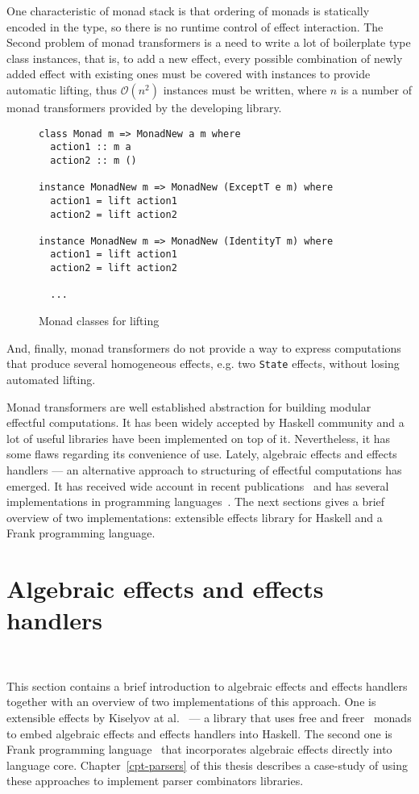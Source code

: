   One characteristic of monad stack is that ordering of monads is statically encoded
  in the type, so there is no runtime control of effect interaction.
  The Second problem of monad transformers is a need to write a lot of boilerplate
  type class instances, that is, to add a new effect, every possible combination
  of newly added effect with existing ones must be covered with instances to provide
  automatic lifting, thus $\mathcal{O}(n^2)$ instances must be written,
  where $n$ is a number of monad transformers provided by the developing library.

  \begin{figure}[h]
  \begin{lstlisting}
class Monad m => MonadNew a m where
  action1 :: m a
  action2 :: m ()

instance MonadNew m => MonadNew (ExceptT e m) where
  action1 = lift action1
  action2 = lift action2

instance MonadNew m => MonadNew (IdentityT m) where
  action1 = lift action1
  action2 = lift action2

  ...
  \end{lstlisting}
  \caption{Monad classes for lifting}
  \label{listing:mtlLift}
  \end{figure}

  And, finally, monad transformers do not provide a way to express computations that produce several homogeneous effects, e.g. two \texttt{State} effects, without losing automated lifting.

  Monad transformers are well established abstraction for building modular effectful
  computations. It has been widely accepted by Haskell community and a lot of
  useful libraries have been implemented on top of it. Nevertheless, it has some
  flaws regarding its convenience of use. Lately, algebraic effects and effects
  handlers --- an alternative approach to structuring of effectful computations
  has emerged. It has received wide account in recent publications~\cite{}
  and has several implementations in programming languages~\cite{}. The next
  sections gives a brief overview of two implementations: extensible effects library
  for Haskell and a Frank programming language.

  \section{Algebraic effects and effects handlers}
  ~\label{cpt-effects:alg-effects}

  This section contains a brief introduction to algebraic effects and effects
  handlers together with an overview of two implementations of this approach.
  One is extensible
  effects by Kiselyov at al.~\cite{Kiselyov:2013:EEA:2578854.2503791} --- a library
  that uses free and freer~\cite{Kiselyov:2015:FMM:2887747.2804319} monads to embed
  algebraic effects and effects handlers into Haskell.
  The second one is Frank programming
  language~\cite{DBLP:conf/popl/LindleyMM17} that incorporates algebraic effects
  directly into language core. Chapter~\ref{cpt-parsers} of this thesis describes
  a case-study of using these approaches to implement parser combinators libraries.


